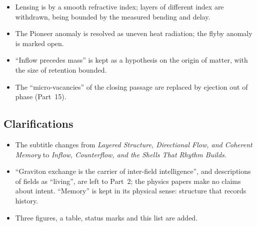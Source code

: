 \documentclass[11pt,a4paper]{article}
\begin{document}
\begin{itemize}
\item Lensing is by a smooth refractive index; layers of different index are withdrawn, being bounded by the measured bending and delay.
\item The Pioneer anomaly is resolved as uneven heat radiation; the flyby anomaly is marked open.
\item ``Inflow precedes mass'' is kept as a hypothesis on the origin of matter, with the size of retention bounded.
\item The ``micro-vacancies'' of the closing passage are replaced by ejection out of phase (Part~15).
\end{itemize}

\subsection*{Clarifications}
\begin{itemize}
\item The subtitle changes from \emph{Layered Structure, Directional Flow, and Coherent Memory} to \emph{Inflow, Counterflow, and the Shells That Rhythm Builds}.
\item ``Graviton exchange is the carrier of inter-field intelligence'', and descriptions of fields as ``living'', are left to Part~2; the physics papers make no claims about intent. ``Memory'' is kept in its physical sense: structure that records history.
\item Three figures, a table, status marks and this list are added.
\end{itemize}

\newpage


\end{document}
